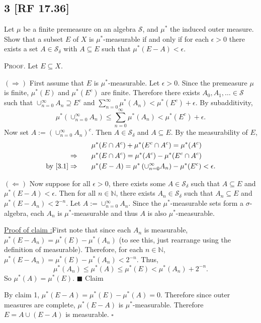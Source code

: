 \documentclass[12pt]{article}
\newcounter{ProofCounter}
\newcounter{ClaimCounter}[ProofCounter]
\newenvironment{Proof}{\stepcounter{ProofCounter}\textsc{Proof.}}{\hfill$\square$}
\newenvironment{claim}[1]{\vspace{1mm}\stepcounter{ClaimCounter}\par\noindent\underline{\bf Claim \theClaimCounter:}\space#1}{}
\newenvironment{claimproof}[1]{\par\noindent\underline{Proof of claim \theClaimCounter:}\space#1}{\hfill $\blacksquare$ Claim \theClaimCounter}
\begin{document}
\subsection*{3 [RF 17.36]}
\begin{tcolorbox}
Let $\mu$ be a finite premeasure on an algebra $\mathcal{S}$, and $\mu^{*}$ the induced outer measure. Show that a subset $E$ of $X$ is
$\mu^*$-measurable if and only if for each $\epsilon > 0$ there exists a set $A \in \mathcal{S}_{\delta}$ with $A\subseteq E$ such that $\mu^*(E-A) <
\epsilon$.
\end{tcolorbox}
\begin{Proof} Let $E \subseteq X$.

$(\Rightarrow)$ First assume that $E$ is $\mu^*$-measurable. Let $\epsilon > 0$. Since the premeasure $\mu$ is finite, $\mu^*(E)$ and $\mu^*(E^{c})$ are finite. Therefore
there exists $A_{0}, A_1, \hdots \in \mathcal{S}$ such that $\cup_{n=0}^{\infty}A_{n} \supseteq E^{c}$ and $\sum_{n=0}^{\infty}\mu^*(A_{n}) <
\mu^{*}(E^c) + \epsilon$. By subadditivity,
\begin{equation}
\mu^{*}\left( \cup_{n=0}^{\infty}A_{n} \right) \leq \sum_{n=0}^{\infty}\mu^*(A_{n}) < \mu^*(E^c) + \epsilon.
\label{3.1}
\end{equation}
Now set $A := \left( \cup_{n=0}^{\infty}A_{n} \right)^{c}$. Then $A \in \mathcal{S}_{\delta}$ and $A\subseteq E$. By the measurability of $E$,
\begin{align*}
& \mu^{*}(E\cap A^{c}) + \mu^{*}(E^{c}\cap A^{c}) = \mu^{*}(A^{c}) \\
\Rightarrow \qquad & \mu^{*}(E\cap A^{c}) = \mu^{*}(A^{c}) - \mu^{*}(E^{c}\cap A^{c}) \\
\text{by } \eqref{3.1} \Rightarrow \qquad & \mu^*(E - A) = \mu^*\left( \cup_{n=0}^{\infty}A_{n} \right) - \mu^{*}(E^{c}) < \epsilon.
\end{align*}

$(\Leftarrow)$ Now suppose for all $\epsilon > 0$, there exists some $A \in \mathcal{S}_{\delta}$ such that $A \subseteq E$ and $\mu^{*}(E - A) <
\epsilon$. Then for all $n \in \mathbb{N}$, there exists $A_{n} \in \mathcal{S}_{\delta}$ such that $A_{n} \subseteq E$ and $\mu^{*}(E - A_{n}) < 2^{-n}$.
Let $A := \cup_{n=0}^{\infty}A_{n}$. Since the $\mu^*$-measurable sets form a $\sigma$-algebra, each $A_{n}$ is $\mu^*$-measurable and thus $A$ is
also $\mu^*$-measurable.
\begin{claimproof}
First note that since each $A_{n}$ is measurable, $\mu^{*}(E - A_{n}) = \mu^*(E) - \mu^*(A_{n})$ (to see this, just rearrange using the definition of measurable).
Therefore, for each $n \in \mathbb{N}$, $\mu^{*}(E - A_{n}) = \mu^{*}(E) - \mu^{*}(A_{n}) < 2^{-n}$. Thus,
\[ \mu^{*}(A_{n}) \leq \mu^{*}(A) \leq \mu^{*}(E) < \mu^{*}(A_{n}) + 2^{-n}. \]
So $\mu^{*}(A) = \mu^{*}(E)$.
\end{claimproof}

By claim 1, $\mu^*(E - A) = \mu^*(E) - \mu^*(A) = 0$. Therefore since outer measures are complete, $\mu^*(E - A)$ is $\mu^{*}$-measurable. Therefore 
$E = A \cup (E - A)$ is measurable.
\end{Proof}
\end{document}
